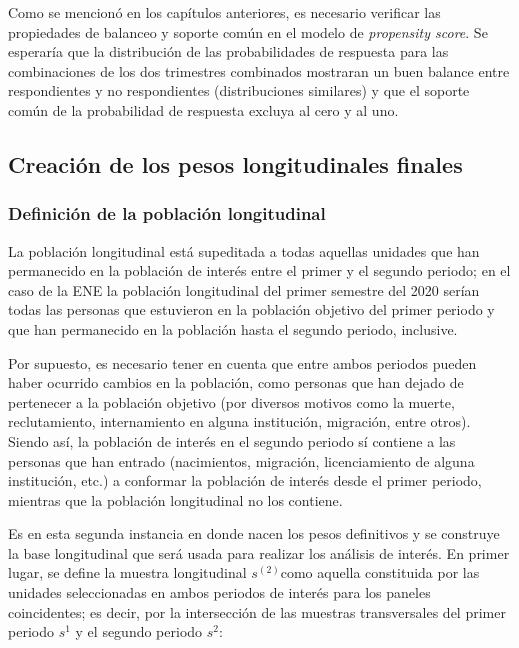 \documentclass[
  12pt,
  spanish,
]{book}
\begin{document}
Como se mencionó en los capítulos anteriores, es necesario verificar las propiedades de balanceo y soporte común en el modelo de \emph{propensity score}. Se esperaría que la distribución de las probabilidades de respuesta para las combinaciones de los dos trimestres combinados mostraran un buen balance entre respondientes y no respondientes (distribuciones similares) y que el soporte común de la probabilidad de respuesta excluya al cero y al uno.

\hypertarget{creaciuxf3n-de-los-pesos-longitudinales-finales}{%
\subsection{Creación de los pesos longitudinales finales}\label{creaciuxf3n-de-los-pesos-longitudinales-finales}}

\hypertarget{definiciuxf3n-de-la-poblaciuxf3n-longitudinal}{%
\subsubsection{Definición de la población longitudinal}\label{definiciuxf3n-de-la-poblaciuxf3n-longitudinal}}

La población longitudinal está supeditada a todas aquellas unidades que han permanecido en la población de interés entre el primer y el segundo periodo; en el caso de la ENE la población longitudinal del primer semestre del 2020 serían todas las personas que estuvieron en la población objetivo del primer periodo y que han permanecido en la población hasta el segundo periodo, inclusive.

Por supuesto, es necesario tener en cuenta que entre ambos periodos pueden haber ocurrido cambios en la población, como personas que han dejado de pertenecer a la población objetivo (por diversos motivos como la muerte, reclutamiento, internamiento en alguna institución, migración, entre otros). Siendo así, la población de interés en el segundo periodo sí contiene a las personas que han entrado (nacimientos, migración, licenciamiento de alguna institución, etc.) a conformar la población de interés desde el primer periodo, mientras que la población longitudinal no los contiene.

Es en esta segunda instancia en donde nacen los pesos definitivos y se construye la base longitudinal que será usada para realizar los análisis de interés. En primer lugar, se define la muestra longitudinal \(s^{(2)}\)como aquella constituida por las unidades seleccionadas en ambos periodos de interés para los paneles coincidentes; es decir, por la intersección de las muestras transversales del primer periodo \(s^1\) y el segundo periodo \(s^2\):
\end{document}
